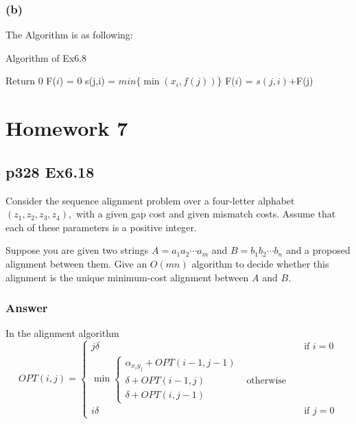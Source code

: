 \documentclass[a4paper]{article}
\begin{document}
\subsubsection*{(b)}
The Algorithm is as following:
\begin{algorithm}[!htb]
	\caption{Algorithm of Ex6.8}
	\begin{algorithmic}[1]
		\State Return{ 0}
		\Else
		\State F($i$) = 0
		\State s(j,i) = $min\{\min \left(x_{i}, f(j)\right)\}$
		\State F($i$) = $s(j,i)$+F(j)
		\EndIf
		\EndFor
		\EndFor
		\EndIf
		\EndFunction
	\end{algorithmic}
\end{algorithm}


\newpage
\section*{Homework 7}
\subsection*{p328 Ex6.18}
\begin{adjustwidth}{1cm}{1cm}
	Consider the sequence alignment problem over a four-letter alphabet $\left(z_{1}, z_{2}, z_{3}, z_{4}\right),$ with a given gap cost and given mismatch costs. Assume that each of these parameters is a positive integer.

	Suppose you are given two strings $A=a_{1} a_{2} \cdots a_{m}$ and $B=b_{1} b_{2} \cdots b_{n}$ and a proposed alignment between them. Give an $O(m n)$ algorithm to decide whether this alignment is the unique minimum-cost alignment between $A$ and $B$.
\end{adjustwidth}

\subsubsection*{Answer}
In the alignment algorithm
$$
	O P T(i, j)=\left\{\begin{array}{ll}
		j \delta & \text { if } i=0                   \\
		\min \left\{\begin{array}{ll}
			\alpha_{x_{i} y_{j}}+O P T(i-1, j-1)       \\
			\delta+O P T(i-1, j) & \text { otherwise } \\
			\delta+O P T(i, j-1)
		\end{array}\right. \\
		i \delta & \text { if } j=0
	\end{array}\right.
$$
\end{document}
